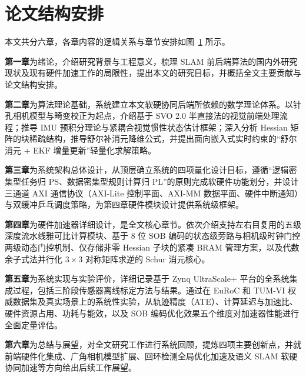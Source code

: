 \section{论文结构安排}

本文共分六章，各章内容的逻辑关系与章节安排如图~\ref{fig:thesis_structure} 所示。

\begin{figure}[h!t]
\centering
\resizebox{0.98\linewidth}{!}{}
\label{fig:thesis_structure}
\end{figure}

\textbf{第一章}为绪论，介绍研究背景与工程意义，梳理 SLAM 前后端算法的国内外研究现状及现有硬件加速工作的局限性，提出本文的研究目标，并概括全文主要贡献与论文结构安排。

\textbf{第二章}为算法理论基础，系统建立本文软硬协同后端所依赖的数学理论体系。以针孔相机模型与畸变校正为起点，介绍基于 SVO 2.0 半直接法的视觉前端处理流程；推导 IMU 预积分理论与紧耦合视觉惯性状态估计框架；深入分析 Hessian 矩阵的块稀疏结构，推导舒尔补消元降维公式，并提出面向嵌入式实时约束的“舒尔消元 + EKF 增量更新”轻量化求解策略。

\textbf{第三章}为系统架构总体设计，从顶层确立系统的四项量化设计目标，遵循“逻辑密集型任务归 PS、数据密集型规则计算归 PL”的原则完成软硬件功能划分，并设计三通道 AXI 通信协议（AXI-Lite 控制平面、AXI-MM 数据平面、硬件中断通知）与双缓冲乒乓调度策略，为第四章硬件模块设计提供系统级框架。

\textbf{第四章}为硬件加速器详细设计，是全文核心章节。依次介绍支持左右目复用的五级深度流水线雅可比计算模块、基于 8 位 SOB 编码的状态级旁路与相机级时钟门控两级动态门控机制、仅存储非零 Hessian 子块的紧凑 BRAM 管理方案，以及代数余子式法并行化 $3\times3$ 对称矩阵求逆的 Schur 消元核心。

\textbf{第五章}为系统实现与实验评价，详细记录基于 Zynq UltraScale+ 平台的全系统集成过程，包括三阶段传感器离线标定方法与结果。通过在 EuRoC 和 TUM-VI 权威数据集及真实场景上的系统性实验，从轨迹精度（ATE）、计算延迟与加速比、硬件资源占用、功耗与能效，以及 SOB 编码优化效果五个维度对加速器性能进行全面定量评估。

\textbf{第六章}为总结与展望，对全文研究工作进行系统回顾，提炼四项主要创新点，并就前端硬件化集成、广角相机模型扩展、回环检测全局优化加速及语义 SLAM 软硬协同加速等方向给出后续工作展望。

